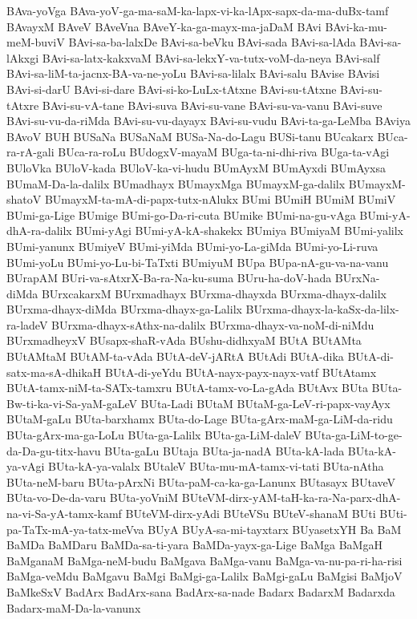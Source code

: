 {BAva-yoVga
BAva-yoV-ga-ma-saM-ka-lapx-vi-ka-lApx-sapx-da-ma-duBx-tamf
BAvayxM
BAveV
BAveVna
BAveY-ka-ga-mayx-ma-jaDaM
BAvi
BAvi-ka-mu-meM-buviV
BAvi-sa-ba-lalxDe
BAvi-sa-beVku
BAvi-sada
BAvi-sa-lAda
BAvi-sa-lAkxgi
BAvi-sa-latx-kakxvaM
BAvi-sa-lekxY-va-tutx-voM-da-neya
BAvi-salf
BAvi-sa-liM-ta-jacnx-BA-va-ne-yoLu
BAvi-sa-lilalx
BAvi-salu
BAvise
BAvisi
BAvi-si-darU
BAvi-si-dare
BAvi-si-ko-LuLx-tAtxne
BAvi-su-tAtxne
BAvi-su-tAtxre
BAvi-su-vA-tane
BAvi-suva
BAvi-su-vane
BAvi-su-va-vanu
BAvi-suve
BAvi-su-vu-da-riMda
BAvi-su-vu-dayayx
BAvi-su-vudu
BAvi-ta-ga-LeMba
BAviya
BAvoV
BUH
BUSaNa
BUSaNaM
BUSa-Na-do-Lagu
BUSi-tanu
BUcakarx
BUca-ra-rA-gali
BUca-ra-roLu
BUdogxV-mayaM
BUga-ta-ni-dhi-riva
BUga-ta-vAgi
BUloVka
BUloV-kada
BUloV-ka-vi-hudu
BUmAyxM
BUmAyxdi
BUmAyxsa
BUmaM-Da-la-dalilx
BUmadhayx
BUmayxMga
BUmayxM-ga-dalilx
BUmayxM-shatoV
BUmayxM-ta-mA-di-papx-tutx-nAlukx
BUmi
BUmiH
BUmiM
BUmiV
BUmi-ga-Lige
BUmige
BUmi-go-Da-ri-cuta
BUmike
BUmi-na-gu-vAga
BUmi-yA-dhA-ra-dalilx
BUmi-yAgi
BUmi-yA-kA-shakekx
BUmiya
BUmiyaM
BUmi-yalilx
BUmi-yanunx
BUmiyeV
BUmi-yiMda
BUmi-yo-La-giMda
BUmi-yo-Li-ruva
BUmi-yoLu
BUmi-yo-Lu-bi-TaTxti
BUmiyuM
BUpa
BUpa-nA-gu-va-na-vanu
BUrapAM
BUri-va-sAtxrX-Ba-ra-Na-ku-suma
BUru-ha-doV-hada
BUrxNa-diMda
BUrxcakarxM
BUrxmadhayx
BUrxma-dhayxda
BUrxma-dhayx-dalilx
BUrxma-dhayx-diMda
BUrxma-dhayx-ga-Lalilx
BUrxma-dhayx-la-kaSx-da-lilx-ra-ladeV
BUrxma-dhayx-sAthx-na-dalilx
BUrxma-dhayx-va-noM-di-niMdu
BUrxmadheyxV
BUsapx-shaR-vAda
BUshu-didhxyaM
BUtA
BUtAMta
BUtAMtaM
BUtAM-ta-vAda
BUtA-deV-jARtA
BUtAdi
BUtA-dika
BUtA-di-satx-ma-sA-dhikaH
BUtA-di-yeYdu
BUtA-nayx-payx-nayx-vatf
BUtAtamx
BUtA-tamx-niM-ta-SATx-tamxru
BUtA-tamx-vo-La-gAda
BUtAvx
BUta
BUta-Bw-ti-ka-vi-Sa-yaM-gaLeV
BUta-Ladi
BUtaM
BUtaM-ga-LeV-ri-papx-vayAyx
BUtaM-gaLu
BUta-barxhamx
BUta-do-Lage
BUta-gArx-maM-ga-LiM-da-ridu
BUta-gArx-ma-ga-LoLu
BUta-ga-Lalilx
BUta-ga-LiM-daleV
BUta-ga-LiM-to-ge-da-Da-gu-titx-havu
BUta-gaLu
BUtaja
BUta-ja-nadA
BUta-kA-lada
BUta-kA-ya-vAgi
BUta-kA-ya-valalx
BUtaleV
BUta-mu-mA-tamx-vi-tati
BUta-nAtha
BUta-neM-baru
BUta-pArxNi
BUta-paM-ca-ka-ga-Lanunx
BUtasayx
BUtaveV
BUta-vo-De-da-varu
BUta-yoVniM
BUteVM-dirx-yAM-taH-ka-ra-Na-parx-dhA-na-vi-Sa-yA-tamx-kamf
BUteVM-dirx-yAdi
BUteVSu
BUteV-shanaM
BUti
BUti-pa-TaTx-mA-ya-tatx-meVva
BUyA
BUyA-sa-mi-tayxtarx
BUyasetxYH
Ba
BaM
BaMDa
BaMDaru
BaMDa-sa-ti-yara
BaMDa-yayx-ga-Lige
BaMga
BaMgaH
BaMganaM
BaMga-neM-budu
BaMgava
BaMga-vanu
BaMga-va-nu-pa-ri-ha-risi
BaMga-veMdu
BaMgavu
BaMgi
BaMgi-ga-Lalilx
BaMgi-gaLu
BaMgisi
BaMjoV
BaMkeSxV
BadArx
BadArx-sana
BadArx-sa-nade
Badarx
BadarxM
Badarxda
Badarx-maM-Da-la-vanunx
}
